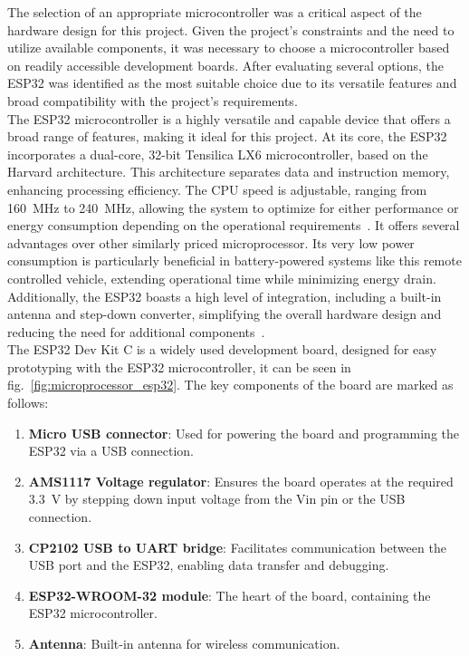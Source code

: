 The selection of an appropriate microcontroller was a critical aspect of the hardware design for this project. Given the project’s constraints and the need to utilize available components, it was necessary to choose a microcontroller based on readily accessible development boards. After evaluating several options, the ESP32 was identified as the most suitable choice due to its versatile features and broad compatibility with the project’s requirements.\\
The ESP32 microcontroller is a highly versatile and capable device that offers a broad range of features, making it ideal for this project. At its core, the ESP32 incorporates a dual-core, 32-bit Tensilica LX6 microcontroller, based on the Harvard architecture. This architecture separates data and instruction memory, enhancing processing efficiency. The CPU speed is adjustable, ranging from \num{160}~\si{\mega\hertz} to \num{240}~\si{\mega\hertz}, allowing the system to optimize for either performance or energy consumption depending on the operational requirements~\cite{Kareem.2021}. It offers several advantages over other similarly priced microprocessor. Its very low power consumption is particularly beneficial in battery-powered systems like this remote controlled vehicle, extending operational time while minimizing energy drain. Additionally, the ESP32 boasts a high level of integration, including a built-in antenna and step-down converter, simplifying the overall hardware design and reducing the need for additional components~\cite{espressif.07.09.2024}.\\
The ESP32 Dev Kit C is a widely used development board, designed for easy prototyping with the ESP32 microcontroller, it can be seen in fig.~\ref{fig:microprocessor_esp32}. The key components of the board are marked as follows:
\begin{enumerate}
	\item \textbf{Micro USB connector}: Used for powering the board and programming the ESP32 via a USB connection.
	\item \textbf{AMS1117 Voltage regulator}: Ensures the board operates at the required \num{3.3}~\si{\volt} by stepping down input voltage from the Vin pin or the USB connection.
	\item \textbf{CP2102 USB to UART bridge}: Facilitates communication between the USB port and the ESP32, enabling data transfer and debugging.
	\item \textbf{ESP32-WROOM-32 module}: The heart of the board, containing the ESP32 microcontroller.
	\item \textbf{Antenna}: Built-in antenna for wireless communication.
\end{enumerate}
